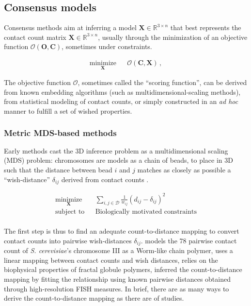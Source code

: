 \documentclass[letterpaper,12pt]{article}
\newcommand{\Xb}{\textbf{X}}
\newcommand{\RR}{\mathbb{R}}
\begin{document}
\subsection*{Consensus models}

Consensus methods aim at inferring a model $\mathbf{X} \in \RR^{3 \times n}$
that best represents the contact count matrix $\mathbf{X} \in \RR^{3 \times
n}$, usually through the minimization of an objective function
$\mathcal{O}(\mathbf{O}, \mathbf{C})$, sometimes under constraints.

\begin{equation*}
\renewcommand{\arraystretch}{2}
\begin{array}{ccl}
\underset{\Xb}{\text{minimize}} & & \mathcal{O}(\mathbf{C}, \Xb) \,,
\end{array}
\end{equation*}

The objective function $\mathcal{O}$, sometimes called the ``scoring
function'', can be derived from known embedding algorithms (such as
multidimensional-scaling methods), from statistical modeling of contact
counts, or simply constructed in an \textit{ad hoc} manner to fulfill a set of
wished properties.

\subsubsection*{Metric MDS-based methods}

Early methods cast the 3D inference problem as a
multidimensional scaling (MDS) problem: chromosomes are models as a chain of
beads, to place in 3D such that the distance between bead $i$ and $j$ matches
as closely as possible a ``wish-distance'' $\delta_{ij}$ derived from contact
counts \citep{dekker:capturing, duan:three-dimensional,
tanizawa:mapping, ay:three-dimensional} .

\begin{equation*}
\renewcommand{\arraystretch}{2}
\begin{array}{ccl}
\underset{\Xb}{\text{minimize}} & & \underset{i, j \in \mathcal{D}}{\sum}
\frac{1}{w_{ij}} (d_{ij} - \delta_{ij})^2 \\
\text{subject to} & & \text{Biologically motivated constraints} \\
\end{array}
\end{equation*}


The first step is thus to find an adequate count-to-distance mapping to
convert contact counts into pairwise wish-distances $\delta_{ij}$. 
\citet{dekker:capturing} models the 78 pairwise contact count of {\em S.
cerevisiae}'s chromosome III as a Worm-like chain polymer,
\citet{duan:three-dimensional} uses a linear mapping between contact counts
and wish distances, \citet{ay:three-dimensional} relies on the biophysical
properties of fractal globule polymers, \citet{tanizawa:mapping} inferred the
count-to-distance mapping by fitting the relationship using known pairwise
distances obtained through high-resolution FISH measures. In brief, there are
as many ways to derive the count-to-distance mapping as there are of studies.
\end{document}
